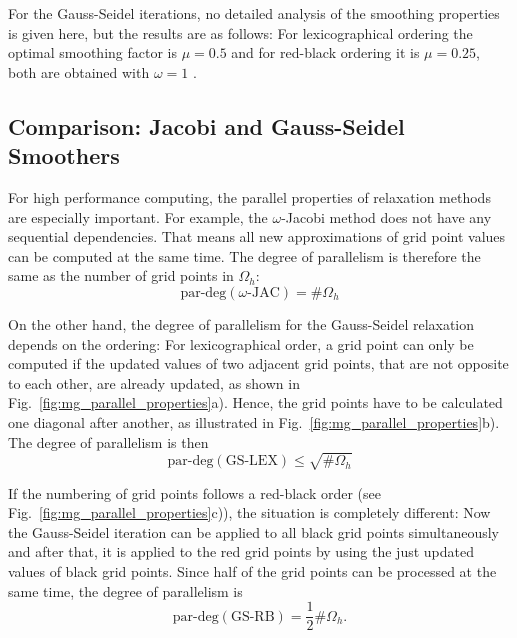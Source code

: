 For the Gauss-Seidel iterations, no detailed analysis of the smoothing properties is given here, but the results are as follows: For lexicographical ordering the optimal smoothing factor is $\mu = 0.5$  and  for red-black ordering it is $\mu = 0.25$, both are obtained with $\omega = 1$ \cite{Trottenberg:2000:MUL:374106}. 


\subsection{Comparison: Jacobi and Gauss-Seidel Smoothers}

For high performance computing, the parallel properties of relaxation methods are especially important. For example, the $\omega$-Jacobi method does not have any sequential dependencies. That means all new approximations of grid point values can be computed at the same time. The degree of parallelism is therefore the same as the number of grid points in $\Omega_h$:
\begin{equation}
\text{par-deg}(\omega\textrm{-JAC}) = \#\Omega_h
\end{equation}

On the other hand, the degree of parallelism for the Gauss-Seidel relaxation depends on the ordering: For lexicographical order, a grid point can only be computed if the updated values of two adjacent grid points, that are not opposite to each other, are already updated, as shown in Fig.~\ref{fig:mg_parallel_properties}a). Hence, the grid points have to be calculated one diagonal after another, as illustrated in Fig.~\ref{fig:mg_parallel_properties}b). The degree of parallelism is then
\begin{equation}
\text{par-deg}(\textrm{GS-LEX}) \leq \sqrt{\#\Omega_h}
\end{equation}

If the numbering of grid points follows a red-black order (see Fig.~\ref{fig:mg_parallel_properties}c)), the situation is completely different: Now the Gauss-Seidel iteration can be applied to all black grid points simultaneously and after that, it is applied to the red grid points by using the just updated values of black grid points. Since half of the grid points can be processed at the same time, the degree of parallelism is 
\begin{equation}
\text{par-deg}(\textrm{GS-RB}) = \frac{1}{2} \#\Omega_h.
\end{equation}



